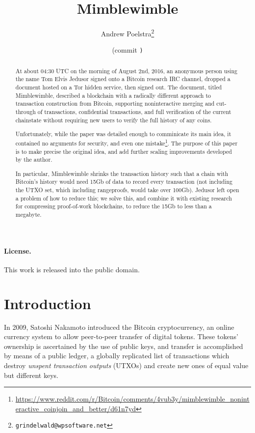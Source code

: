\documentclass[letterpaper]{article}
\title{Mimblewimble}
\author{Andrew Poelstra\footnote{\texttt{grindelwald@wpsoftware.net}}}
\date{\gitAuthorDate{} (commit \texttt{\gitAbbrevHash)}}
\begin{document}
\maketitle

\begin{abstract} 
At about 04:30 UTC on the morning of August 2nd, 2016, an anonymous person
using the name Tom Elvis Jedusor signed onto a Bitcoin research IRC channel,
dropped a document hosted on a Tor hidden service\cite{voldemort2016}, then signed out. The
document, titled Mimblewimble, described a blockchain with a radically
different approach to transaction construction from Bitcoin, supporting
noninteractive merging and cut-through of transactions, confidential
transactions, and full verification of the current chainstate without
requiring new users to verify the full history of any coins.

Unfortunately, while the paper was detailed enough to comminicate its main
idea, it contained no arguments for security, and even one mistake\footnote{\url{https://www.reddit.com/r/Bitcoin/comments/4vub3y/mimblewimble_noninteractive_coinjoin_and_better/d61n7yd}}.
The purpose of this paper is to make precise the original idea, and add
further scaling improvements developed by the author.

In particular, Mimblewimble shrinks the transaction history such that a
chain with Bitcoin's history would need 15Gb of data to record every
transaction (not including the UTXO set, which including rangeproofs,
would take over 100Gb). Jedusor left open a problem of how to reduce
this; we solve this, and combine it with existing research for compressing
proof-of-work blockchains, to reduce the 15Gb to less than a megabyte.
\end{abstract}

\paragraph{License.} This work is released into the public domain.

\clearpage
\tableofcontents

\modulolinenumbers[10]
\linenumbers

\section{Introduction}

In 2009, Satoshi Nakamoto introduced the Bitcoin cryptocurrency\cite{nakamoto2009},
an online currency system to allow peer-to-peer transfer of digital tokens.
These tokens' ownership is ascertained by the use of public keys, and transfer
is accomplished by means of a public ledger, a globally replicated list of
transactions which destroy \emph{unspent transaction outputs} (UTXOs) and
create new ones of equal value but different keys.
\end{document}
